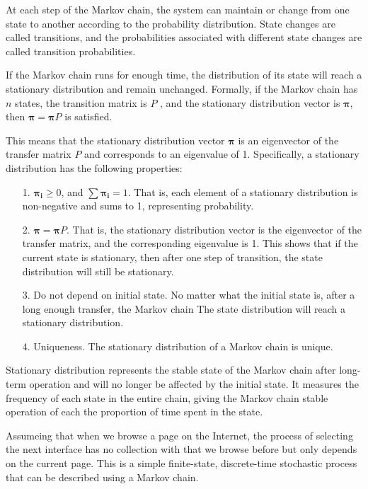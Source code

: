 \documentclass[lettersize,journal,12pt]{IEEEtran}
\begin{document}
At each step of the Markov chain, the system can maintain or change from one state to another according to the probability distribution. State changes are called transitions, and the probabilities associated with different state changes are called transition probabilities.

If the Markov chain runs for enough time, the distribution of its state will reach a stationary distribution and remain unchanged. Formally, if the Markov chain has $n$ states, the transition matrix is $P$
, and the stationary distribution vector is $\boldsymbol{\pi}$, then $\boldsymbol{\pi} = \boldsymbol{\pi} P$ is satisfied.

This means that the stationary distribution vector $\boldsymbol{\pi}$ is an eigenvector of the transfer matrix $P$ and corresponds to an eigenvalue of 1. Specifically, a stationary distribution has the following properties:
\begin{enumerate}
	\item [1.] $\boldsymbol{\pi_i}\geq0$, and $\sum\boldsymbol{\pi_i}=1$. That is, each element of a stationary distribution is non-negative and sums to 1, representing probability.
	\item [2.] $\boldsymbol{\pi} = \boldsymbol{\pi} P$. That is, the stationary distribution vector is the eigenvector of the transfer matrix, and the corresponding eigenvalue is 1. This shows that if the current state is stationary, then after one step of transition, the state distribution will still be stationary.
	\item [3.] Do not depend on initial state. No matter what the initial state is, after a long enough transfer, the Markov chain
	      The state distribution will reach a stationary distribution.
	\item [4.] Uniqueness. The stationary distribution of a Markov chain is unique.
\end{enumerate}

Stationary distribution represents the stable state of the Markov chain after long-term operation and will no longer be affected by the initial state.
It measures the frequency of each state in the entire chain, giving the Markov chain stable operation of each the proportion of time spent in the state.

Assumeing that when we browse a page on the Internet, the process of selecting the next interface has no collection with that we browse before but only depends on the current page. This is a simple finite-state, discrete-time stochastic process that can be described using a Markov chain.
\end{document}

